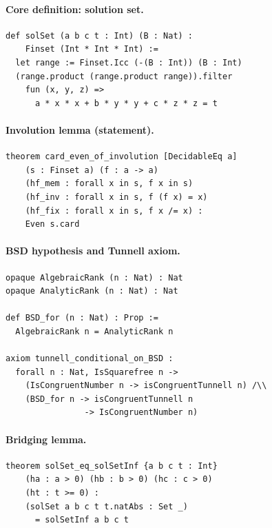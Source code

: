 \documentclass[11pt,a4paper]{article}
\theoremstyle{definition}
\begin{document}
\paragraph{Core definition: solution set.}
\begin{lstlisting}
def solSet (a b c t : Int) (B : Nat) :
    Finset (Int * Int * Int) :=
  let range := Finset.Icc (-(B : Int)) (B : Int)
  (range.product (range.product range)).filter
    fun (x, y, z) =>
      a * x * x + b * y * y + c * z * z = t
\end{lstlisting}

\paragraph{Involution lemma (statement).}
\begin{lstlisting}
theorem card_even_of_involution [DecidableEq a]
    (s : Finset a) (f : a -> a)
    (hf_mem : forall x in s, f x in s)
    (hf_inv : forall x in s, f (f x) = x)
    (hf_fix : forall x in s, f x /= x) :
    Even s.card
\end{lstlisting}

\paragraph{BSD hypothesis and Tunnell axiom.}
\begin{lstlisting}
opaque AlgebraicRank (n : Nat) : Nat
opaque AnalyticRank (n : Nat) : Nat

def BSD_for (n : Nat) : Prop :=
  AlgebraicRank n = AnalyticRank n

axiom tunnell_conditional_on_BSD :
  forall n : Nat, IsSquarefree n ->
    (IsCongruentNumber n -> isCongruentTunnell n) /\\
    (BSD_for n -> isCongruentTunnell n
                -> IsCongruentNumber n)
\end{lstlisting}

\paragraph{Bridging lemma.}
\begin{lstlisting}
theorem solSet_eq_solSetInf {a b c t : Int}
    (ha : a > 0) (hb : b > 0) (hc : c > 0)
    (ht : t >= 0) :
    (solSet a b c t t.natAbs : Set _)
      = solSetInf a b c t
\end{lstlisting}
\end{document}

